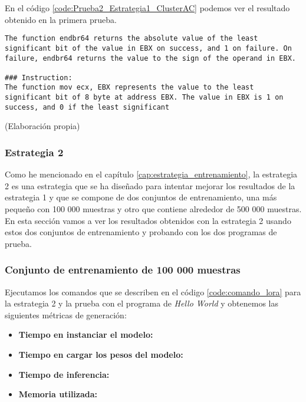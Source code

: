 En el código \ref{code:Prueba2_Estrategia1_ClusterAC} podemos ver el resultado obtenido
en la primera prueba.

\begin{mycode}
    \begin{verbatim}
The function endbr64 returns the absolute value of the least significant bit of the value in EBX on success, and 1 on failure. On failure, endbr64 returns the value to the sign of the operand in EBX.

### Instruction:
The function mov ecx, EBX represents the value to the least significant bit of 8 byte at address EBX. The value in EBX is 1 on success, and 0 if the least significant
    \end{verbatim}
    \caption[]{ (Elaboración propia)}
    \label{code:Prueba2_Estrategia1_ClusterAC}
\end{mycode}

\subsubsection{Estrategia 2}
\label{subsubsec:resultados:estrategia_2}


Como he mencionado en el capítulo \ref{cap:estrategia_entrenamiento}, la estrategia 2
es una estrategia que se ha diseñado para intentar mejorar los resultados de la estrategia 1
y que se compone de dos conjuntos de entrenamiento, una más pequeño con 100 000 muestras y otro
que contiene alrededor de 500 000 muestras. En esta sección vamos a ver los resultados obtenidos
con la estrategia 2 usando estos dos conjuntos de entrenamiento y probando con los dos programas
de prueba.

\subsubsection{Conjunto de entrenamiento de 100 000 muestras}

Ejecutamos los comandos que se describen en el código \ref{code:comando_lora} para
la estrategia 2 y la prueba con el programa de \textit{Hello World} y obtenemos
las siguientes métricas de generación:

\begin{itemize}
    \item \textbf{Tiempo en instanciar el modelo:}
    \item \textbf{Tiempo en cargar los pesos del modelo:}
    \item \textbf{Tiempo de inferencia:}
    \item \textbf{Memoria utilizada:}
\end{itemize}

